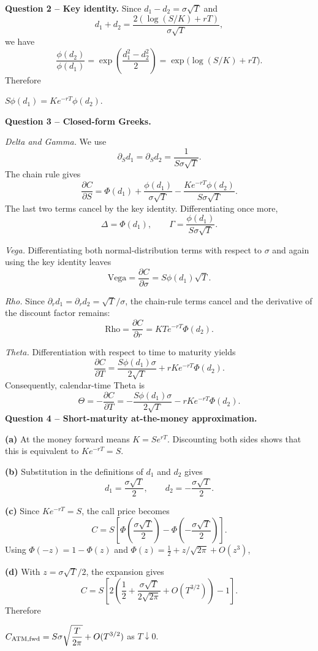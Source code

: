 \documentclass[10pt]{article}
\newcommand{\solution}[1]{\begin{tcolorbox}[breakable,colback=ResultBlue!3,colframe=ResultBlue,
  boxrule=0.8pt,arc=1mm,title=\textbf{Result},fonttitle=\bfseries]#1\end{tcolorbox}}
\begin{document}
\textbf{Question 2 -- Key identity.} Since $d_1-d_2=\sigma\sqrt T$ and
\[
d_1+d_2=\frac{2(\log(S/K)+rT)}{\sigma\sqrt T},
\]
we have
\[
\frac{\phi(d_2)}{\phi(d_1)}
=\exp\left(\frac{d_1^2-d_2^2}{2}\right)
=\exp\bigl(\log(S/K)+rT\bigr).
\]
Therefore
\solution{$\displaystyle S\phi(d_1)=Ke^{-rT}\phi(d_2)$.}

\textbf{Question 3 -- Closed-form Greeks.}

\emph{Delta and Gamma.} We use
\[
\partial_Sd_1=\partial_Sd_2=\frac{1}{S\sigma\sqrt T}.
\]
The chain rule gives
\[
\frac{\partial C}{\partial S}
=\Phi(d_1)+\frac{\phi(d_1)}{\sigma\sqrt T}
-\frac{Ke^{-rT}\phi(d_2)}{S\sigma\sqrt T}.
\]
The last two terms cancel by the key identity. Differentiating once more,
\[
\boxed{\Delta=\Phi(d_1),\qquad
\Gamma=\frac{\phi(d_1)}{S\sigma\sqrt T}.}
\]

\emph{Vega.} Differentiating both normal-distribution terms with respect to
$\sigma$ and again using the key identity leaves
\[
\boxed{\mathrm{Vega}=\frac{\partial C}{\partial\sigma}
=S\phi(d_1)\sqrt T.}
\]

\emph{Rho.} Since
$\partial_rd_1=\partial_rd_2=\sqrt T/\sigma$, the chain-rule terms cancel and
the derivative of the discount factor remains:
\[
\boxed{\mathrm{Rho}=\frac{\partial C}{\partial r}
=KT e^{-rT}\Phi(d_2).}
\]

\emph{Theta.} Differentiation with respect to time to maturity yields
\[
\frac{\partial C}{\partial T}
=\frac{S\phi(d_1)\sigma}{2\sqrt T}
+rKe^{-rT}\Phi(d_2).
\]
Consequently, calendar-time Theta is
\[
\boxed{\Theta=-\frac{\partial C}{\partial T}
=-\frac{S\phi(d_1)\sigma}{2\sqrt T}
-rKe^{-rT}\Phi(d_2).}
\]
\textbf{Question 4 -- Short-maturity at-the-money approximation.}

\textbf{(a)} At the money forward means $K=Se^{rT}$. Discounting both sides
shows that this is equivalent to $Ke^{-rT}=S$.

\textbf{(b)} Substitution in the definitions of $d_1$ and $d_2$ gives
\[
d_1=\frac{\sigma\sqrt T}{2},\qquad
d_2=-\frac{\sigma\sqrt T}{2}.
\]

\textbf{(c)} Since $Ke^{-rT}=S$, the call price becomes
\[
C=S\left[\Phi\left(\frac{\sigma\sqrt T}{2}\right)
-\Phi\left(-\frac{\sigma\sqrt T}{2}\right)\right].
\]
Using $\Phi(-z)=1-\Phi(z)$ and
$\Phi(z)=\frac12+z/\sqrt{2\pi}+O(z^3)$,

\textbf{(d)} With $z=\sigma\sqrt T/2$, the expansion gives
\[
C=S\left[
2\left(\frac12+\frac{\sigma\sqrt T}{2\sqrt{2\pi}}
+O(T^{3/2})\right)-1\right].
\]
Therefore
\solution{$\displaystyle
C_{\rm ATM,fwd}=S\sigma\sqrt{\frac{T}{2\pi}}+O(T^{3/2})$
as $T\downarrow0$.}
\end{document}
